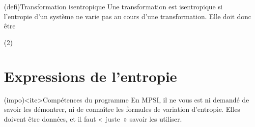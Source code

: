 \documentclass[../../main/main.tex]{subfiles}
\begin{document}
\begin{tcb*}(defi){Transformation isentropique}
	Une transformation est isentropique si l'entropie d'un système ne varie pas au
	cours d'une transformation. Elle doit donc être
	\begin{tasks}[label=\bdmd](2)
		\task {}
		\task {}
	\end{tasks}
\end{tcb*}

\section{Expressions de l'entropie}
\begin{tcn}(impo)<itc>{Compétences du programme}
	En MPSI, il ne vous est ni demandé de savoir les démontrer, ni de connaître
	les formules de variation d'entropie. Elles doivent être données, et il faut
	«~juste~» savoir les utiliser.
\end{tcn}
\end{document}
